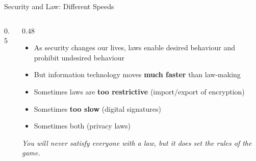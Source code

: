 \documentclass[aspectratio=169,11pt,xcolor={table}]{beamer}
\begin{document}
\begin{frame}{Security and Law: Different Speeds}
  \begin{columns}[c]
    \begin{column}{0.5\textwidth}
      \centering
    \end{column}
    \begin{column}{0.48\textwidth}
      \begin{itemize}\small\setlength{\itemsep}{3pt}
        \item As security changes our lives, laws enable desired behaviour and prohibit undesired behaviour
        \item But information technology moves \textbf{much faster} than law-making
        \item Sometimes laws are \textbf{too restrictive} (import/export of encryption)
        \item Sometimes \textbf{too slow} (digital signatures)
        \item Sometimes both (privacy laws)
      \end{itemize}
      {\small\textit{You will never satisfy everyone with a law, but it does set the rules of the game.}}
    \end{column}
  \end{columns}
\end{frame}
\end{document}
